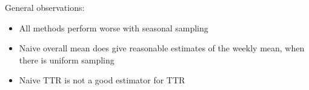 \documentclass[
	8pt, %
]{beamer}
\begin{document}
\begin{frame}
	General observations:
	\begin{itemize}
		\item All methods perform worse with seasonal sampling
		\item Naive overall mean does give reasonable estimates of the weekly
		mean, when there is uniform sampling
		\item Naive TTR is not a good estimator for TTR
	\end{itemize}




\end{frame}
\end{document}
